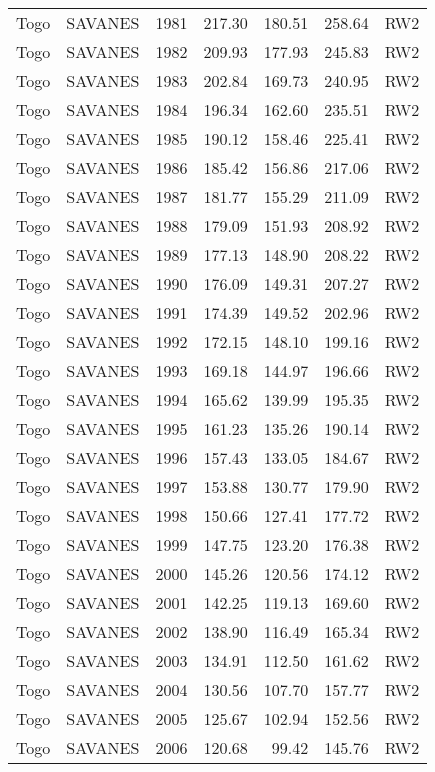 \begin{longtable}{lllrrrl}
  Togo & SAVANES & 1981 & 217.30 & 180.51 & 258.64 & RW2 \\ 
  Togo & SAVANES & 1982 & 209.93 & 177.93 & 245.83 & RW2 \\ 
  Togo & SAVANES & 1983 & 202.84 & 169.73 & 240.95 & RW2 \\ 
  Togo & SAVANES & 1984 & 196.34 & 162.60 & 235.51 & RW2 \\ 
  Togo & SAVANES & 1985 & 190.12 & 158.46 & 225.41 & RW2 \\ 
  Togo & SAVANES & 1986 & 185.42 & 156.86 & 217.06 & RW2 \\ 
  Togo & SAVANES & 1987 & 181.77 & 155.29 & 211.09 & RW2 \\ 
  Togo & SAVANES & 1988 & 179.09 & 151.93 & 208.92 & RW2 \\ 
  Togo & SAVANES & 1989 & 177.13 & 148.90 & 208.22 & RW2 \\ 
  Togo & SAVANES & 1990 & 176.09 & 149.31 & 207.27 & RW2 \\ 
  Togo & SAVANES & 1991 & 174.39 & 149.52 & 202.96 & RW2 \\ 
  Togo & SAVANES & 1992 & 172.15 & 148.10 & 199.16 & RW2 \\ 
  Togo & SAVANES & 1993 & 169.18 & 144.97 & 196.66 & RW2 \\ 
  Togo & SAVANES & 1994 & 165.62 & 139.99 & 195.35 & RW2 \\ 
  Togo & SAVANES & 1995 & 161.23 & 135.26 & 190.14 & RW2 \\ 
  Togo & SAVANES & 1996 & 157.43 & 133.05 & 184.67 & RW2 \\ 
  Togo & SAVANES & 1997 & 153.88 & 130.77 & 179.90 & RW2 \\ 
  Togo & SAVANES & 1998 & 150.66 & 127.41 & 177.72 & RW2 \\ 
  Togo & SAVANES & 1999 & 147.75 & 123.20 & 176.38 & RW2 \\ 
  Togo & SAVANES & 2000 & 145.26 & 120.56 & 174.12 & RW2 \\ 
  Togo & SAVANES & 2001 & 142.25 & 119.13 & 169.60 & RW2 \\ 
  Togo & SAVANES & 2002 & 138.90 & 116.49 & 165.34 & RW2 \\ 
  Togo & SAVANES & 2003 & 134.91 & 112.50 & 161.62 & RW2 \\ 
  Togo & SAVANES & 2004 & 130.56 & 107.70 & 157.77 & RW2 \\ 
  Togo & SAVANES & 2005 & 125.67 & 102.94 & 152.56 & RW2 \\ 
  Togo & SAVANES & 2006 & 120.68 & 99.42 & 145.76 & RW2 \\ 

\end{longtable}
